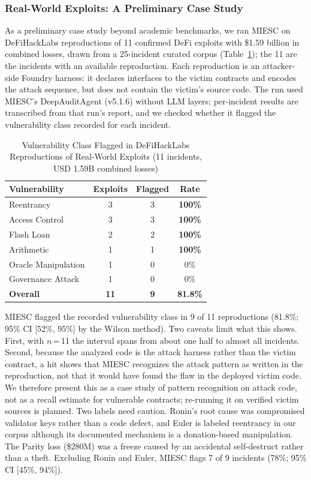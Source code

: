 \documentclass[conference]{IEEEtran}
\begin{document}
\subsubsection{Real-World Exploits: A Preliminary Case Study}

As a preliminary case study beyond academic benchmarks, we ran MIESC on DeFiHackLabs reproductions of 11 confirmed DeFi exploits with \$1.59 billion in combined losses, drawn from a 25-incident curated corpus (Table~\ref{tab:exploits}); the 11 are the incidents with an available reproduction. Each reproduction is an attacker-side Foundry harness: it declares interfaces to the victim contracts and encodes the attack sequence, but does not contain the victim's source code. The run used MIESC's DeepAuditAgent (v5.1.6) without LLM layers; per-incident results are transcribed from that run's report, and we checked whether it flagged the vulnerability class recorded for each incident.

\begin{table}[htbp]
\caption{Vulnerability Class Flagged in DeFiHackLabs Reproductions of Real-World Exploits (11 incidents, USD 1.59B combined losses)}
\label{tab:exploits}
\centering
\begin{tabular}{@{}lccc@{}}
\toprule
\textbf{Vulnerability} & \textbf{Exploits} & \textbf{Flagged} & \textbf{Rate} \\
\midrule
Reentrancy & 3 & 3 & \textbf{100\%} \\
Access Control & 3 & 3 & \textbf{100\%} \\
Flash Loan & 2 & 2 & \textbf{100\%} \\
Arithmetic & 1 & 1 & \textbf{100\%} \\
Oracle Manipulation & 1 & 0 & 0\% \\
Governance Attack & 1 & 0 & 0\% \\
\midrule
\textbf{Overall} & \textbf{11} & \textbf{9} & \textbf{81.8\%} \\
\bottomrule
\end{tabular}
\end{table}

MIESC flagged the recorded vulnerability class in 9 of 11 reproductions (81.8\%; 95\% CI [52\%, 95\%] by the Wilson method). Two caveats limit what this shows. First, with $n$\,=\,11 the interval spans from about one half to almost all incidents. Second, because the analyzed code is the attack harness rather than the victim contract, a hit shows that MIESC recognizes the attack pattern as written in the reproduction, not that it would have found the flaw in the deployed victim code. We therefore present this as a case study of pattern recognition on attack code, not as a recall estimate for vulnerable contracts; re-running it on verified victim sources is planned. Two labels need caution. Ronin's root cause was compromised validator keys rather than a code defect, and Euler is labeled reentrancy in our corpus although its documented mechanism is a donation-based manipulation. The Parity loss (\$280M) was a freeze caused by an accidental self-destruct rather than a theft. Excluding Ronin and Euler, MIESC flags 7 of 9 incidents (78\%; 95\% CI [45\%, 94\%]).
\end{document}
